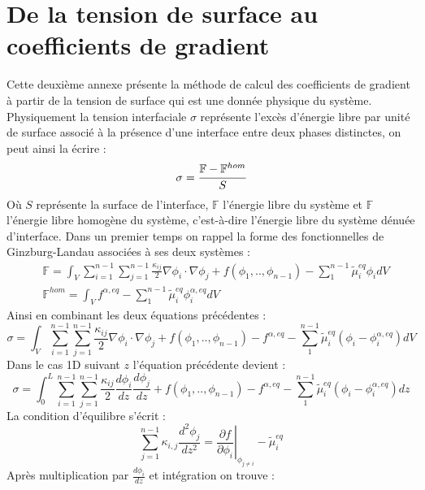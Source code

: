 
\chapter{De la tension de surface au coefficients de gradient}
Cette deuxième annexe présente la méthode de calcul des coefficients de gradient à partir de la tension de surface qui est une donnée physique du système. Physiquement la tension interfaciale $\sigma$ représente l'excès d'énergie libre par unité de surface associé à la présence d'une interface entre deux phases distinctes, on peut ainsi la écrire :
\begin{equation}
\sigma = \cfrac{\mathbb{F}-\mathbb{F}^{hom}}{S}
\end{equation}
Où $S$ représente la surface de l'interface, $\mathbb{F}$ l'énergie libre du système et $\mathbb{F}$ l'énergie libre homogène du système, c'est-à-dire l'énergie libre du système dénuée d'interface. 
Dans un premier temps on rappel la forme des fonctionnelles de Ginzburg-Landau associées à ses deux systèmes :
\begin{align*}
&\mathbb{F} = \int_{V}\sum_{i=1}^{n-1}\sum_{j=1}^{n-1}\frac{\kappa_{ij}}{2}\nabla \phi_i \cdot \nabla \phi_j + f(\phi_1,..,\phi_{n-1}) - \sum_{1}^{n-1}\tilde{\mu}_i^{eq}\phi_i dV \\
&\mathbb{F}^{hom} = \int_V f^{\alpha,eq}  - \sum_{1}^{n-1}\tilde{\mu}_i^{eq}\phi_i^{\alpha,eq} dV 
\end{align*}
Ainsi en combinant les deux équations précédentes : 
\begin{equation}
\sigma = \int_{V}\sum_{i=1}^{n-1}\sum_{j=1}^{n-1}\frac{\kappa_{ij}}{2}\nabla \phi_i \cdot \nabla \phi_j + f(\phi_1,..,\phi_{n-1}) - f^{\alpha,eq} - \sum_{1}^{n-1}\tilde{\mu}_i^{eq}(\phi_i-\phi_i^{\alpha,eq}) dV
\end{equation}
Dans le cas 1D suivant $z$ l'équation précédente devient : 
\begin{equation}
\sigma = \int_{0}^L\sum_{i=1}^{n-1}\sum_{j=1}^{n-1}\frac{\kappa_{ij}}{2}\frac{ d\phi_i}{dz} \frac{ d\phi_j}{dz} + f(\phi_1,..,\phi_{n-1}) - f^{\alpha,eq} - \sum_{1}^{n-1}\tilde{\mu}_i^{eq}(\phi_i-\phi_i^{\alpha,eq}) dz
\end{equation}
La condition d'équilibre s'écrit :
\begin{equation}
\sum_{j=1}^{n-1} \kappa_{i,j} \frac{d^2\phi_j}{dz^2} = \left.\frac{\partial f}{\partial \phi_i}\right|_{\phi_{j\neq i}} - \tilde{\mu}_i^{eq}
\end{equation}
Après multiplication par $\displaystyle \frac{d\phi_i}{dz}$ et intégration on trouve :
